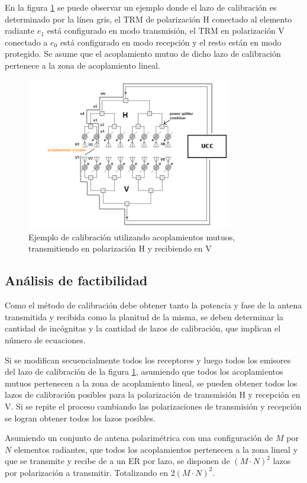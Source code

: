 En la figura \ref{fig:mutual_general} se puede observar un ejemplo donde el lazo de calibración es determinado por la línea
gris, el TRM de polarización H conectado al elemento radiante $e_1$ está configurado en modo transmisión, el TRM en
polarización V conectado a $e_0$ está configurado en modo recepción y el resto están en modo protegido. Se asume que el
acoplamiento mutuo de dicho lazo de calibración pertenece a la zona de acoplamiento lineal.
\begin{figure}[H]
 \centering
 \includegraphics[width=9cm]{gfx/mutualCouplingExample.png}
 \caption{Ejemplo de calibración utilizando acoplamientos mutuos, transmitiendo en polarización H y recibiendo en V}
 \label{fig:mutual_general}
\end{figure}


\subsection{Análisis de factibilidad} \label{ssc:feasibility}

Como el método de calibración debe obtener tanto la potencia y fase de la antena transmitida y recibida como la planitud de
la misma, se deben determinar la cantidad de incógnitas y la cantidad de lazos de calibración, que implican el número de 
ecuaciones.

Si se modifican secuencialmente todos los receptores y luego todos los emisores del lazo de calibración de la figura
\ref{fig:mutual_general}, asumiendo que todos los acoplamientos mutuos pertenecen a la zona de acoplamiento lineal, se pueden obtener 
todos los lazos de calibración posibles para la polarización de transmisión H y recepción en V. Si se repite el proceso
cambiando las polarizaciones de transmisión y recepción se logran obtener todos los lazos posibles.

Asumiendo un conjunto de antena polarimétrica con una configuración de $M$ por $N$ elementos radiantes, que todos los
acoplamientos pertenecen a la zona lineal y que se transmite y recibe de a un ER por lazo, se disponen de $(M\cdot N)^2$ lazos
por polarización a transmitir. Totalizando en $2(M\cdot N)^2$.

